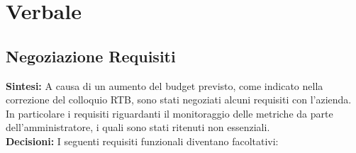 \documentclass{article}
\begin{document}
\newpage
\section{Verbale}

    \subsection{Negoziazione Requisiti}
    \textbf{Sintesi:} A causa di un aumento del budget previsto, come indicato nella correzione 
        del colloquio RTB, sono stati negoziati alcuni requisiti con l'azienda. \\
        In particolare i requisiti riguardanti il monitoraggio delle metriche da parte 
        dell'amministratore, i quali sono stati ritenuti non essenziali. \\
    \textbf{Decisioni:} I seguenti requisiti funzionali diventano facoltativi:
\end{document}
